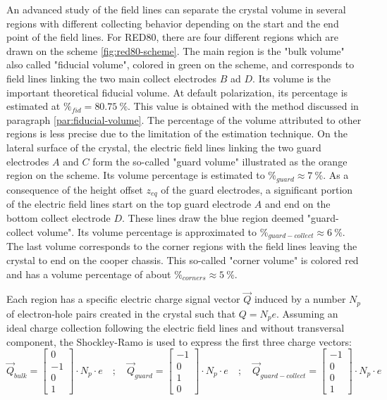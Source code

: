 An advanced study of the field lines can separate the crystal volume in several regions with different collecting behavior depending on the start and the end point of the field lines. For RED80, there are four different regions which are drawn on the scheme \ref{fig:red80-scheme}. 
The main region is the "bulk volume" also called "fiducial volume", colored in green on the scheme, and corresponds to field lines linking the two main collect electrodes $B$ ad $D$. Its volume is the important theoretical fiducial volume. At default polarization, its percentage is estimated at $\%_{fid}=\SI{80.75}{\percent}$. This value is obtained with the method discussed in paragraph \ref{par:fiducial-volume}. The percentage of the volume attributed to other regions is less precise due to the limitation of the estimation technique.
On the lateral surface of the crystal, the electric field lines linking the two guard electrodes $A$ and $C$ form the so-called "guard volume" illustrated as the orange region on the scheme. Its volume percentage is estimated to $\%_{guard} \approx \SI{7}{\percent}$. 
As a consequence of the height offset $z_{eq}$ of the guard electrodes, a significant portion of the electric field lines start on the top guard electrode $A$ and end on the bottom collect electrode $D$. These lines draw the blue region deemed "guard-collect volume". Its volume percentage is approximated to $\%_{guard-collect} \approx \SI{6}{\percent}$.
The last volume corresponds to the corner regions with the field lines leaving the crystal to end on the cooper chassis. This so-called "corner volume" is colored red and has a volume percentage of about $\%_{corners} \approx \SI{5}{\percent}$.

Each region has a specific electric charge signal vector $\vec{Q}$ induced by a number $N_p$ of electron-hole pairs created in the crystal such that $Q = N_p e$. Assuming an ideal charge collection following the electric field lines and without transversal component, the Shockley-Ramo is used to express the first three charge vectors:
\begin{equation}
\label{eq:red80-induced-charges}
\vec{Q}_{bulk} =
\begin{bmatrix}
0 \\ -1 \\ 0 \\ 1
\end{bmatrix}
\cdot N_p \cdot e
\quad ; \quad
\vec{Q}_{guard} =
\begin{bmatrix}
-1 \\ 0 \\ 1 \\ 0
\end{bmatrix}
\cdot N_p \cdot e
\quad ; \quad
\vec{Q}_{guard-collect} =
\begin{bmatrix}
-1 \\ 0 \\ 0 \\ 1
\end{bmatrix}
\cdot N_p \cdot e
\end{equation}

